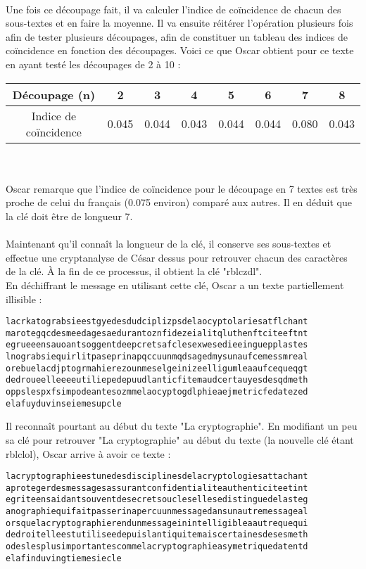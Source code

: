 		\\
		Une fois ce découpage fait, il va calculer l'indice de coïncidence de chacun des sous-textes et en faire la moyenne. Il va ensuite réitérer l'opération plusieurs fois afin de tester plusieurs découpages, afin de constituer un tableau des indices de coïncidence en fonction des découpages. Voici ce que Oscar obtient pour ce texte en ayant testé les découpages de 2 à 10 :\\
		\begin{tabular}{ | c | c | c | c | c | c | c | c | }
			\hline
Découpage (n) & 2 & 3 & 4 & 5 & 6 & 7 & 8 \\ \hline
Indice de coïncidence & 0.045 & 0.044 & 0.043 & 0.044 & 0.044 & 0.080 & 0.043 \\
			\hline
		\end{tabular} \\
		\\
		Oscar remarque que l'indice de coïncidence pour le découpage en 7 textes est très proche de celui du français (0.075 environ) comparé aux autres. Il en déduit que la clé doit être de longueur 7.\\
		\\
		Maintenant qu'il connaît la longueur de la clé, il conserve ses sous-textes et effectue une cryptanalyse de César dessus pour retrouver chacun des caractères de la clé. À la fin de ce processus, il obtient la clé "rblczdl".\\
		En déchiffrant le message en utilisant cette clé, Oscar a un texte partiellement illisible :
		\begin{lstlisting}
lacrkatograbsieestgyedesdudciplizpsdelaocyptolariesatflchant
marotegqcdesmeedagesaedurantoznfidezeialitqluthenftciteeftnt
egrueeensauoantsoggentdeepcretsafclesexwesedieeinguepplastes
lnograbsiequirlitpaseprinapqccuunmqdsagedmysunaufcemessmreal
orebuelacdjptogrmahierezounmeselgeinizeelligumleaaufcequeqgt
dedroueelleeeeutiliepedepuudlanticfitemaudcertauyesdesqdmeth
oppslespxfsimpodeantesozmmelaocyptogdlphieaejmetricfedatezed
elafuyduvinseiemesupcle
		\end{lstlisting}
		Il reconnaît pourtant au début du texte "La cryptographie". En modifiant un peu sa clé pour retrouver "La cryptographie" au début du texte (la nouvelle clé étant rblclol), Oscar arrive à avoir ce texte :
		\begin{lstlisting}
lacryptographieestunedesdisciplinesdelacryptologiesattachant
aprotegerdesmessagesassurantconfidentialiteauthenticiteetint
egriteensaidantsouventdesecretsouclesellesedistinguedelasteg
anographiequifaitpasserinapercuunmessagedansunautremessageal
orsquelacryptographierendunmessageinintelligibleaautrequequi
dedroitelleestutiliseedepuislantiquitemaiscertainesdesesmeth
odeslesplusimportantescommelacryptographieasymetriquedatentd
elafinduvingtiemesiecle
		\end{lstlisting}

